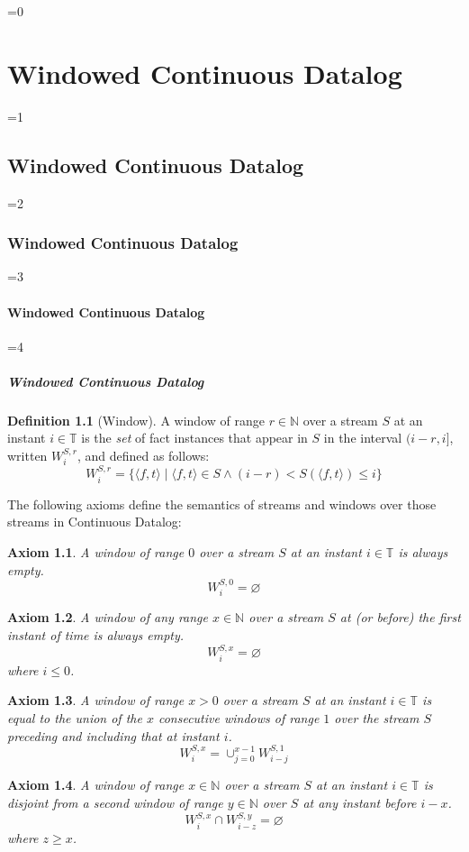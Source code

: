 \documentclass[twocolumn,preprint,3p,number]{elsarticle}
\theoremstyle{plain}
\newtheorem{axiom}{Axiom}
\theoremstyle{definition}
\newtheorem{definition}{Definition}
\newcounter{nestingdepth}
\newenvironment{nestedsection}[2]{
  \ifnum\value{nestingdepth}=0
    \chapter{#1}
  \else
    \ifnum\value{nestingdepth}=1
      \section{#1}
    \else
      \ifnum\value{nestingdepth}=2
        \subsection{#1}
      \else
        \ifnum\value{nestingdepth}=3
          \subsubsection{#1}
        \else
          \ifnum\value{nestingdepth}=4
            \paragraph{#1}
          \else
            \PackageError{nestedsections}{Maximum nesting level exceeded!}{uh oh!}
          \fi
        \fi
      \fi
    \fi
  \fi
  \addtocounter{nestingdepth}{1}
  \label{sec:#2}
}{\addtocounter{nestingdepth}{-1}}
\begin{document}
\begin{nestedsection}{Windowed Continuous Datalog}{semantics}
\begin{definition}[Window]
A window of range ${r \in \mathbb{N}}$ over a stream $S$ at an instant
${i \in \mathbb{T}}$ is the \emph{set} of fact instances that appear in
$S$ in the interval ${(i-r,i]}$, written ${W^{S,r}_{i}}$, and defined as follows:
\[
W^{S,r}_i = \{ \langle f, t \rangle \mid \langle f, t \rangle \in S \land (i - r) < S(\langle f, t\rangle) \leqslant i \}
\]  
\end{definition}

The following axioms define the semantics of streams and windows over
those streams in Continuous Datalog:

{\nobreak\begin{axiom}\label{axiom:continuous datalog: window range leq 0}
A window of range $0$ over a stream $S$ at an instant 
${i \in \mathbb{T}}$ is always empty.
\begin{equation*}
W^{S,0}_{i} = \varnothing
\end{equation*}
\end{axiom}}

{\nobreak\begin{axiom}\label{axiom:continuous datalog: window start leq 0}
A window of any range $x \in \mathbb{N}$ over a stream $S$ at (or before)
the first instant of time is always empty.
\begin{equation*}
W^{S,x}_{i} = \varnothing
\end{equation*}
where $i \leqslant 0$.
\end{axiom}}

{\nobreak\begin{axiom}\label{axiom:continuous datalog: window composition}
A window of range ${x > 0}$ over a stream $S$ at an instant 
${i \in \mathbb{T}}$ is equal to the union of the $x$ consecutive
windows of range $1$ over the stream $S$ preceding and including that at
instant $i$.
\begin{equation*}
W^{S,x}_{i} = \mathop{\cup}_{j=0}^{x-1} W^{S,1}_{i-j}
\end{equation*}
\end{axiom}}

{\nobreak\begin{axiom}\label{axiom:continuous datalog: window disjointness}
A window of range ${x \in \mathbb{N}}$ over a stream $S$ at an
instant ${i \in \mathbb{T}}$ is disjoint from a second window of 
range ${y \in \mathbb{N}}$ over $S$ at any instant before $i - x$.
\begin{equation*}
W^{S,x}_{i} \cap W^{S,y}_{i-z} = \varnothing
\end{equation*}
where $z \geqslant x$.
\end{axiom}}


\end{nestedsection}
\end{document}

